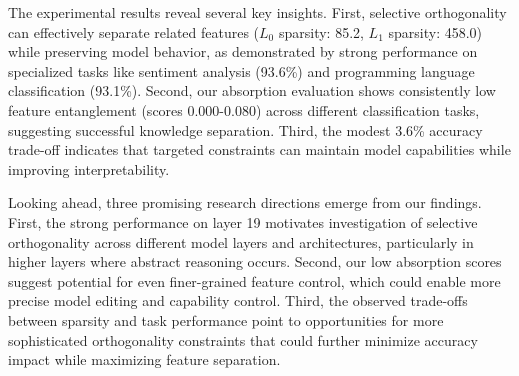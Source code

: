 \documentclass{article} %
\begin{document}
The experimental results reveal several key insights. First, selective orthogonality can effectively separate related features ($L_0$ sparsity: 85.2, $L_1$ sparsity: 458.0) while preserving model behavior, as demonstrated by strong performance on specialized tasks like sentiment analysis (93.6\%) and programming language classification (93.1\%). Second, our absorption evaluation shows consistently low feature entanglement (scores 0.000-0.080) across different classification tasks, suggesting successful knowledge separation. Third, the modest 3.6\% accuracy trade-off indicates that targeted constraints can maintain model capabilities while improving interpretability.

Looking ahead, three promising research directions emerge from our findings. First, the strong performance on layer 19 motivates investigation of selective orthogonality across different model layers and architectures, particularly in higher layers where abstract reasoning occurs. Second, our low absorption scores suggest potential for even finer-grained feature control, which could enable more precise model editing and capability control. Third, the observed trade-offs between sparsity and task performance point to opportunities for more sophisticated orthogonality constraints that could further minimize accuracy impact while maximizing feature separation.



\end{document}
